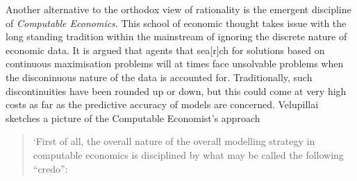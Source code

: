 \documentclass{ucthesis}
\begin{document}
Another alternative to the orthodox view of rationality is the emergent
discipline of \textit{Computable Economics}. This school of economic thought
takes issue with the long standing tradition within the mainstream of
ignoring the discrete nature of economic data. It is argued that agents that
sea{\LARGE [r]}ch for solutions based on continuous maximisation problems
will at times face unsolvable problems when the disconinuous nature of the
data is accounted for. Traditionally, such discontinuities have been rounded
up or down, but this could come at very high costs as far as the predictive
accuracy of models are concerned. Velupillai \cite[pp. 22-24]{Vela 2005}
sketches a picture of the Computable Economist's approach

\begin{quotation}
\qquad `First of all, the overall nature of the overall modelling strategy
in computable economics is disciplined by what may be called the following
\textquotedblleft credo\textquotedblright :
\end{quotation}
\end{document}
